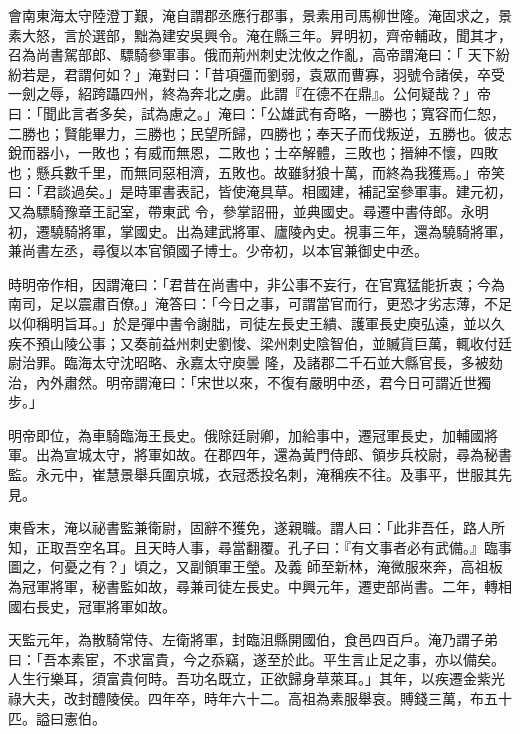 \begin{pinyinscope}
 會南東海太守陸澄丁艱，淹自謂郡丞應行郡事，景素用司馬柳世隆。淹固求之，景素大怒，言於選部，黜為建安吳興令。淹在縣三年。昇明初，齊帝輔政，聞其才，召為尚書駕部郎、驃騎參軍事。俄而荊州刺史沈攸之作亂，高帝謂淹曰：「
 天下紛紛若是，君謂何如？」淹對曰：「昔項彊而劉弱，袁眾而曹寡，羽號令諸侯，卒受一劍之辱，紹跨躡四州，終為奔北之虜。此謂『在德不在鼎』。公何疑哉？」帝曰：「聞此言者多矣，試為慮之。」淹曰：「公雄武有奇略，一勝也；寬容而仁恕，二勝也；賢能畢力，三勝也；民望所歸，四勝也；奉天子而伐叛逆，五勝也。彼志銳而器小，一敗也；有威而無恩，二敗也；士卒解體，三敗也；搢紳不懷，四敗也；懸兵數千里，而無同惡相濟，五敗也。故雖豺狼十萬，而終為我獲焉。」帝笑曰：「君談過矣。」是時軍書表記，皆使淹具草。相國建，補記室參軍事。建元初，又為驃騎豫章王記室，帶東武
 令，參掌詔冊，並典國史。尋遷中書侍郎。永明初，遷驍騎將軍，掌國史。出為建武將軍、廬陵內史。視事三年，還為驍騎將軍，兼尚書左丞，尋復以本官領國子博士。少帝初，以本官兼御史中丞。



 時明帝作相，因謂淹曰：「君昔在尚書中，非公事不妄行，在官寬猛能折衷；今為南司，足以震肅百僚。」淹答曰：「今日之事，可謂當官而行，更恐才劣志薄，不足以仰稱明旨耳。」於是彈中書令謝朏，司徒左長史王繢、護軍長史庾弘遠，並以久疾不預山陵公事；又奏前益州刺史劉悛、梁州刺史陰智伯，並贓貨巨萬，輒收付廷尉治罪。臨海太守沈昭略、永嘉太守庾曇
 隆，及諸郡二千石並大縣官長，多被劾治，內外肅然。明帝謂淹曰：「宋世以來，不復有嚴明中丞，君今日可謂近世獨步。」



 明帝即位，為車騎臨海王長史。俄除廷尉卿，加給事中，遷冠軍長史，加輔國將軍。出為宣城太守，將軍如故。在郡四年，還為黃門侍郎、領步兵校尉，尋為秘書監。永元中，崔慧景舉兵圍京城，衣冠悉投名刺，淹稱疾不往。及事平，世服其先見。



 東昏末，淹以祕書監兼衛尉，固辭不獲免，遂親職。謂人曰：「此非吾任，路人所知，正取吾空名耳。且天時人事，尋當翻覆。孔子曰：『有文事者必有武備。』臨事圖之，何憂之有？」頃之，又副領軍王瑩。及義
 師至新林，淹微服來奔，高祖板為冠軍將軍，秘書監如故，尋兼司徒左長史。中興元年，遷吏部尚書。二年，轉相國右長史，冠軍將軍如故。



 天監元年，為散騎常侍、左衛將軍，封臨沮縣開國伯，食邑四百戶。淹乃謂子弟曰：「吾本素宦，不求富貴，今之忝竊，遂至於此。平生言止足之事，亦以備矣。人生行樂耳，須富貴何時。吾功名既立，正欲歸身草萊耳。」其年，以疾遷金紫光祿大夫，改封醴陵侯。四年卒，時年六十二。高祖為素服舉哀。賻錢三萬，布五十匹。謚曰憲伯。




\end{pinyinscope}
